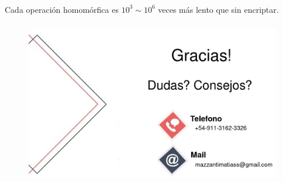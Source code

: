 \documentclass[handout]{beamer}
\begin{document}
\begin{frame}
\frametitle{}
  Cada operación homomórfica es $10^3 \sim 10^6$ veces más lento que sin  encriptar.

\end{frame}
\begin{frame}
\frametitle{}
  \begin{figure}[h!]
      \centering
      \includegraphics[scale=0.3]{agradecimientos.jpg}
  \end{figure}
\end{frame}
\end{document}
